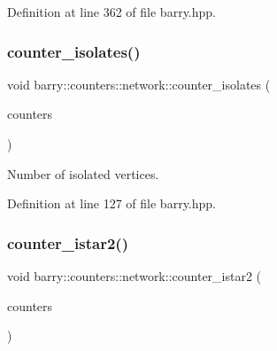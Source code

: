 Definition at line 362 of file barry.\+hpp.

\mbox{\label{namespacebarry_1_1counters_1_1network_abb12a5ddff5be1b860139a1a9bc3ff87}} 
\subsubsection{\texorpdfstring{counter\+\_\+isolates()}{counter\_isolates()}}
{\footnotesize\ttfamily void barry\+::counters\+::network\+::counter\+\_\+isolates (\begin{DoxyParamCaption}\item[{\hyperlink{namespacebarry_1_1counters_1_1network_aa72fdb34752ac24167a06ee196a8fff6}{Net\+Counters} $\ast$}]{counters }\end{DoxyParamCaption})\hspace{0.3cm}{\ttfamily [inline]}}



Number of isolated vertices. 



Definition at line 127 of file barry.\+hpp.

\mbox{\label{namespacebarry_1_1counters_1_1network_ac1cf7a400dacb5fd40750ba4a0c00e81}} 
\subsubsection{\texorpdfstring{counter\+\_\+istar2()}{counter\_istar2()}}
{\footnotesize\ttfamily void barry\+::counters\+::network\+::counter\+\_\+istar2 (\begin{DoxyParamCaption}\item[{\hyperlink{namespacebarry_1_1counters_1_1network_aa72fdb34752ac24167a06ee196a8fff6}{Net\+Counters} $\ast$}]{counters }\end{DoxyParamCaption})\hspace{0.3cm}{\ttfamily [inline]}}




